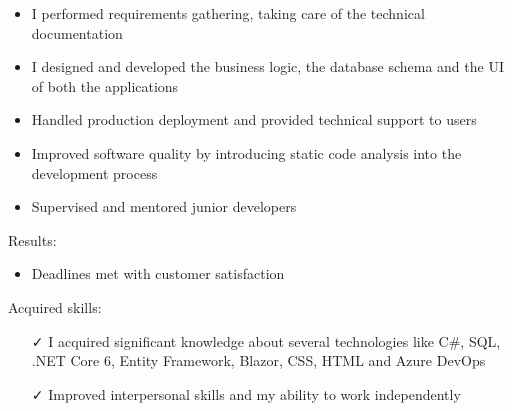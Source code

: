 \documentclass[english,10pt,a4paper]{article}
\newcommand{\Color}[1]{\textcolor{CvColor}{#1}}
\newcommand{\CvCheck}{\textcolor{CvColor}{\faCheck}}
\begin{document}
\begin{paracol}{2}
\begin{tcolorbox}[colback=white, height=\textheight, colframe=white, left=0cm]
\begin{itemize}
{\begin{itemize}
\begin{itemize}
						\item I performed requirements gathering, taking care of the technical documentation
						
						\item I designed and developed the business logic, the database schema and the UI of both the applications
						
						\item Handled production deployment and provided technical support to users
						
						\item Improved software quality by introducing static code analysis into the development process
						
						\item Supervised and mentored junior developers
					\end{itemize}
					
					\textcolor{CvColor}{Results:}
					\begin{itemize}
						\item Deadlines met with customer satisfaction
					\end{itemize}
					
					\textcolor{CvColor}{Acquired skills:}
					\begin{itemize}
						\item[\CvCheck] I acquired significant knowledge about several technologies like \Color{C\#}, \Color{SQL}, \Color{.NET Core 6}, \Color{Entity Framework}, \Color{Blazor}, \Color{CSS}, \Color{HTML} and \Color{Azure DevOps}
						\item[\CvCheck] Improved interpersonal skills and my ability to work independently 
					\end{itemize}						
				\end{itemize}
			}
		
		
		
		
	\end{itemize}
	



\end{tcolorbox}
\end{paracol}
\newpage
\end{document}
